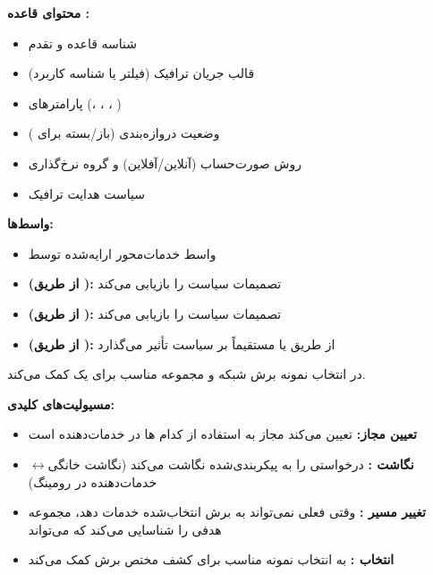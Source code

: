 \textbf{محتوای قاعده :}

\begin{itemize}
\tightlist
\item
  شناسه قاعده و تقدم
\item
  قالب جریان ترافیک (فیلتر  یا شناسه کاربرد)
\item
  پارامترهای  (، ، ، )
\item
  وضعیت دروازه‌بندی (باز/\allowbreak{}بسته برای )
\item
  روش صورت‌حساب (آنلاین/\allowbreak{}آفلاین) و گروه نرخ‌گذاری
\item
  سیاست هدایت ترافیک
\end{itemize}

\textbf{واسط‌ها:}

\begin{itemize}
\tightlist
\item
   واسط خدمات‌محور ارایه‌شده توسط 
\item
  \textbf{ (از طریق ):}  تصمیمات سیاست  را بازیابی می‌کند
\item
  \textbf{ (از طریق ):}  تصمیمات سیاست  را بازیابی می‌کند
\item
  \textbf{ (از طریق ):}  از طریق  یا مستقیماً بر سیاست تأثیر می‌گذارد
\end{itemize}


 در انتخاب نمونه برش شبکه و مجموعه  مناسب برای یک  کمک می‌کند.

\textbf{مسیولیت‌های کلیدی:}

\begin{itemize}
\tightlist
\item
  \textbf{تعیین  مجاز:} تعیین می‌کند  مجاز به استفاده از کدام ها در  خدمات‌دهنده است
\item
  \textbf{نگاشت :}  درخواستی را به  پیکربندی‌شده نگاشت می‌کند (نگاشت  خانگی\ensuremath{\leftrightarrow}خدمات‌دهنده در رومینگ)
\item
  \textbf{تغییر مسیر :} وقتی  فعلی نمی‌تواند به برش انتخاب‌شده خدمات دهد،  مجموعه  هدفی را شناسایی می‌کند که می‌تواند
\item
  \textbf{انتخاب :} به انتخاب نمونه  مناسب برای کشف  مختص برش کمک می‌کند
\end{itemize}

